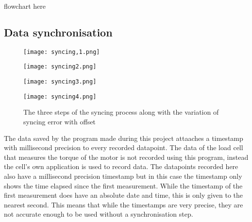\documentclass[12pt]{article}
\begin{document}
flowchart here


\subsection{Data synchronisation}

\begin{figure}[h]

    \begin{minipage}{0.49\textwidth}
        \centering
        \texttt{[image: syncing,1.png]}
        
    \end{minipage}
    \begin{minipage}{0.49\textwidth}
        \centering
        \texttt{[image: syncing2.png]}
        
    \end{minipage}

    \begin{minipage}{0.49\textwidth}
        \centering
        \texttt{[image: syncing3.png]}
        
    \end{minipage}
    \begin{minipage}{0.49\textwidth}
        \centering
        \texttt{[image: syncing4.png]}
        
    \end{minipage}
    \caption{The three steps of the syncing process along with the variation of syncing error with offset}
    \label{fig:syncing}
\end{figure}



The data saved by the program made during this project attaaches a timestamp with millisecond precision to every recorded datapoint. The data of the load cell that measures the torque of the motor is not recorded using this program, instead the cell's own application is used to record data. The datapoints recorded here also have a millisecond precision timestamp but in this case the timestamp only shows the time elapsed since the first measurement. While the timestamp of the first measurement does have an absolute date and time, this is only given to the nearest second. This means that while the timestamps are very precise, they are not accurate enough to be used without a synchronisation step.\\
\end{document}
